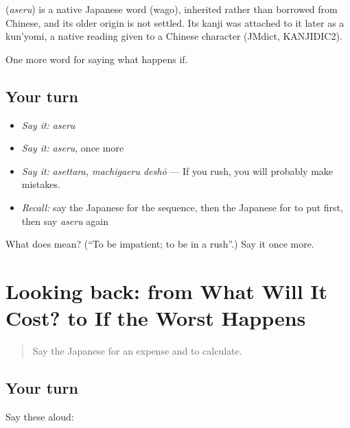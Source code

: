 \begin{cousinweb}
\textbf{} (\emph{aseru}) is a native Japanese word (wago), inherited rather than borrowed from Chinese, and its older origin is not settled. Its kanji was attached to it later as a kun'yomi, a native reading given to a Chinese character (JMdict, KANJIDIC2).
\end{cousinweb}

\begin{grammarlens}[title={What you've built}]
One more word for saying what happens if.
\end{grammarlens}

\subsection*{Your turn}
\begin{itemize}
\raggedright
  \item \emph{Say it:} \emph{aseru}
  \item \emph{Say it:} \emph{aseru}, once more
  \item \emph{Say it:} \emph{asettara, machigaeru deshō} — If you rush, you will probably make mistakes.
  \item \emph{Recall:} say the Japanese for the sequence, then the Japanese for to put first, then say \emph{aseru} again
\end{itemize}

\begin{tcolorbox}[breakable,colback=teal!4,colframe=teal!35!black,title={Before you move on}]
What does  mean? (\textquotedblleft{}To be impatient; to be in a rush\textquotedblright{}.) Say it once more.
\end{tcolorbox}
\section[(dialogue)]{Looking back: from What Will It Cost? to If the Worst Happens}

\label{lesson:JA-R366-review-362-366}



\begin{quote}
Say the Japanese for an expense and to calculate.
\end{quote}

\subsection*{Your turn}
Say these aloud:

